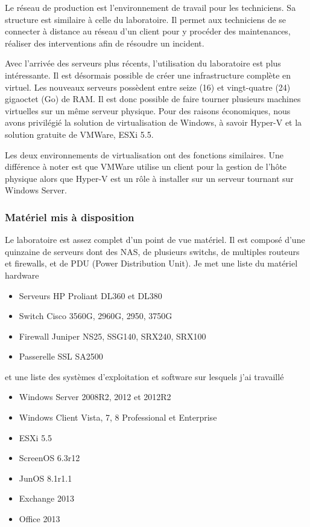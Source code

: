 Le réseau de production est l'environnement de travail pour les techniciens. 
Sa structure est similaire à celle du laboratoire.
Il permet aux techniciens de se connecter à distance au réseau d'un client pour y procéder des maintenances, réaliser des interventions afin de résoudre un incident.

Avec l'arrivée des serveurs plus récents, l'utilisation du laboratoire est plus intéressante.
Il est désormais possible de créer une infrastructure complète en virtuel.
Les nouveaux serveurs possèdent entre seize (16) et vingt-quatre (24) gigaoctet (Go) de RAM.
Il est donc possible de faire tourner plusieurs machines virtuelles sur un même serveur physique.
Pour des raisons économiques, nous avons privilégié la solution de virtualisation de Windows, à savoir Hyper-V et la solution gratuite de VMWare, ESXi 5.5.

Les deux environnements de virtualisation ont des fonctions similaires.
Une différence à noter est que VMWare utilise un client pour la gestion de l'hôte physique alors que Hyper-V est un rôle à installer sur un serveur tournant sur Windows Server.  

\subsubsection{Matériel mis à disposition}
Le laboratoire est assez complet d'un point de vue matériel. 
Il est composé d'une quinzaine de serveurs dont des NAS, de plusieurs switchs, de multiples routeurs et firewalls, et de PDU (Power Distribution Unit).
Je met une liste du matériel hardware
\begin{itemize}
	\item Serveurs HP Proliant DL360 et DL380
	\item Switch Cisco 3560G, 2960G, 2950, 3750G
	\item Firewall Juniper NS25, SSG140, SRX240, SRX100
	\item Passerelle SSL SA2500
\end{itemize}
et une liste des systèmes d'exploitation et software sur lesquels j'ai travaillé
\begin{itemize}
	\item Windows Server 2008R2, 2012 et 2012R2
	\item Windows Client Vista, 7, 8 Professional et Enterprise
	\item ESXi 5.5
	\item ScreenOS 6.3r12
	\item JunOS 8.1r1.1
	\item Exchange 2013
	\item Office 2013
\end{itemize}

